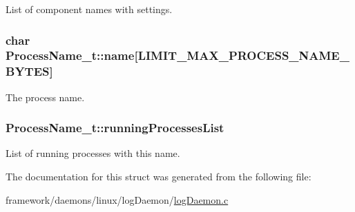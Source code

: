 List of component names with settings. 

\subsubsection[{\texorpdfstring{name}{name}}]{\setlength{\rightskip}{0pt plus 5cm}char Process\+Name\+\_\+t\+::name\mbox{[}{\bf L\+I\+M\+I\+T\+\_\+\+M\+A\+X\+\_\+\+P\+R\+O\+C\+E\+S\+S\+\_\+\+N\+A\+M\+E\+\_\+\+B\+Y\+T\+ES}\mbox{]}}\hypertarget{struct_process_name__t_af99fe462162508666c8917e0653f6c83}{}\label{struct_process_name__t_af99fe462162508666c8917e0653f6c83}


The process name. 

\subsubsection[{\texorpdfstring{running\+Processes\+List}{runningProcessesList}}]{ Process\+Name\+\_\+t\+::running\+Processes\+List}\hypertarget{struct_process_name__t_aa1c0fc7dc784ead2a354009c292bf9e8}{}\label{struct_process_name__t_aa1c0fc7dc784ead2a354009c292bf9e8}


List of running processes with this name. 



The documentation for this struct was generated from the following file\+:\begin{DoxyCompactItemize}
\item 
framework/daemons/linux/log\+Daemon/\hyperlink{log_daemon_8c}{log\+Daemon.\+c}\end{DoxyCompactItemize}
